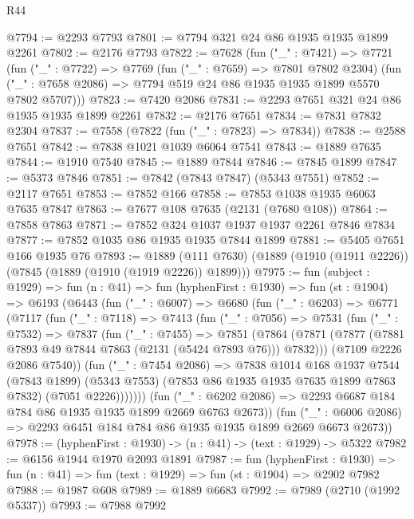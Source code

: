 \begin{lexlean}{R44}
\begin{coremodule}
@7794 := @2293 @7793
@7801 := @7794 @321 @24 @86 @1935 @1935 @1899 @2261
@7802 := @2176 @7793
@7822 := @7628
    (fun ("_" : @7421) =>
    @7721
      (fun ("_" : @7722) =>
      @7769
        (fun ("_" : @7659) => @7801 @7802 @2304)
        (fun ("_" : @7658 @2086) => @7794 @519 @24 @86 @1935 @1935 @1899 @5570 @7802 @5707)))
@7823 := @7420 @2086
@7831 := @2293 @7651 @321 @24 @86 @1935 @1935 @1899 @2261
@7832 := @2176 @7651
@7834 := @7831 @7832 @2304
@7837 := @7558 (@7822 (fun ("_" : @7823) => @7834))
@7838 := @2588 @7651
@7842 := @7838 @1021 @1039 @6064 @7541
@7843 := @1889 @7635
@7844 := @1910 @7540
@7845 := @1889 @7844
@7846 := @7845 @1899
@7847 := @5373 @7846
@7851 := @7842 (@7843 @7847) (@5343 @7551)
@7852 := @2117 @7651
@7853 := @7852 @166
@7858 := @7853 @1038 @1935 @6063 @7635 @7847
@7863 := @7677 @108 @7635 (@2131 (@7680 @108))
@7864 := @7858 @7863
@7871 := @7852 @324 @1037 @1937 @1937 @2261 @7846 @7834
@7877 := @7852 @1035 @86 @1935 @1935 @7844 @1899
@7881 := @5405 @7651 @166 @1935 @76
@7893 := @1889
    (@111 @7630)
    (@1889 (@1910 (@1911 @2226)) (@7845 (@1889 (@1910 (@1919 @2226)) @1899)))
@7975 := fun (subject : @1929) =>
  fun (n : @41) =>
  fun (hyphenFirst : @1930) =>
  fun (st : @1904) =>
  @6193
    (@6443
      (fun ("_" : @6007) =>
      @6680
        (fun ("_" : @6203) =>
        @6771
          (@7117
            (fun ("_" : @7118) =>
            @7413
              (fun ("_" : @7056) =>
              @7531
                (fun ("_" : @7532) =>
                @7837
                  (fun ("_" : @7455) =>
                  @7851
                    (@7864
                      (@7871 (@7877 (@7881 @7893 @49 @7844 @7863 (@2131 (@5424 @7893 @76))) @7832)))
                    (@7109 @2226 @2086 @7540))
                  (fun ("_" : @7454 @2086) =>
                  @7838
                    @1014
                    @168
                    @1937
                    @7544
                    (@7843 @1899)
                    (@5343 @7553)
                    (@7853 @86 @1935 @1935 @7635 @1899 @7863 @7832)
                    (@7051 @2226)))))))
        (fun ("_" : @6202 @2086) => @2293 @6687 @184 @784 @86 @1935 @1935 @1899 @2669 @6763 @2673))
      (fun ("_" : @6006 @2086) => @2293 @6451 @184 @784 @86 @1935 @1935 @1899 @2669 @6673 @2673))
@7978 := (hyphenFirst : @1930) -> (n : @41) -> (text : @1929) -> @5322
@7982 := @6156 @1944 @1970 @2093 @1891
@7987 := fun (hyphenFirst : @1930) =>
  fun (n : @41) => fun (text : @1929) => fun (st : @1904) => @2902 @7982
@7988 := @1987 @608
@7989 := @1889 @6683
@7992 := @7989 (@2710 (@1992 @5337))
@7993 := @7988 @7992

\end{coremodule}
\end{lexlean}
